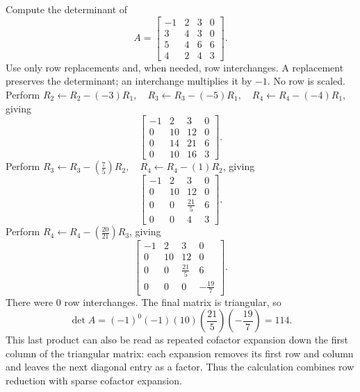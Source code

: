\goal Compute the determinant of
\[A=\begin{bmatrix}-1&2&3&0\\3&4&3&0\\5&4&6&6\\4&2&4&3\end{bmatrix}.\]
Use only row replacements and, when needed, row interchanges. A replacement preserves the determinant; an interchange multiplies it by $-1$. No row is scaled.
Perform $R_2\leftarrow R_2-(-3)R_1,\quad R_3\leftarrow R_3-(-5)R_1,\quad R_4\leftarrow R_4-(-4)R_1$, giving
\[
\begin{bmatrix}-1&2&3&0\\0&10&12&0\\0&14&21&6\\0&10&16&3\end{bmatrix}.
\]
Perform $R_3\leftarrow R_3-(\frac{7}{5})R_2,\quad R_4\leftarrow R_4-(1)R_2$, giving
\[
\begin{bmatrix}-1&2&3&0\\0&10&12&0\\0&0&\frac{21}{5}&6\\0&0&4&3\end{bmatrix}.
\]
Perform $R_4\leftarrow R_4-(\frac{20}{21})R_3$, giving
\[
\begin{bmatrix}-1&2&3&0\\0&10&12&0\\0&0&\frac{21}{5}&6\\0&0&0&- \frac{19}{7}\end{bmatrix}.
\]
There were $0$ row interchanges. The final matrix is triangular, so
\[\det A=(-1)^{0}(-1)(10)(\frac{21}{5})(- \frac{19}{7})=114.\]
This last product can also be read as repeated cofactor expansion down the first column of the triangular matrix: each expansion removes its first row and column and leaves the next diagonal entry as a factor. Thus the calculation combines row reduction with sparse cofactor expansion.


